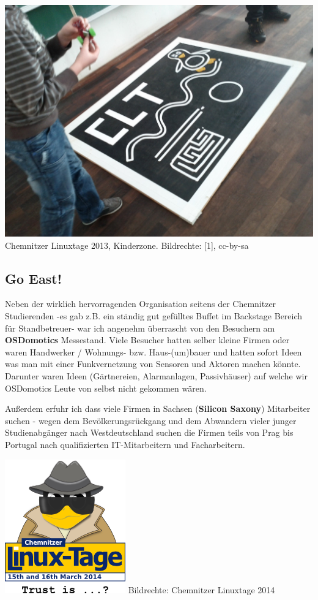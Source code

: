 \begin{center}
\includegraphics[width=\linewidth]{chemnitz_kinderzone1.jpg}
\footnotesize{Chemnitzer Linuxtage 2013, Kinderzone. Bildrechte: [1], cc-by-sa}
\end{center}

\subsection*{Go East!}
Neben der wirklich hervorragenden Organisation seitens der Chemnitzer Studierenden -es gab z.B. ein ständig gut gefülltes Buffet im Backstage Bereich für Standbetreuer- war ich angenehm überrascht von den Besuchern am \textbf{OSDomotics} Messestand. Viele Besucher hatten selber kleine Firmen oder waren Handwerker / Wohnungs- bzw. Haus-(um)bauer und hatten sofort Ideen was man mit einer Funkvernetzung von Sensoren und Aktoren machen könnte. Darunter waren Ideen (Gärtnereien, Alarmanlagen, Passivhäuser) auf welche wir OSDomotics Leute von selbst nicht gekommen wären. 

Außerdem erfuhr ich dass viele Firmen in Sachsen (\textbf{Silicon Saxony}) Mitarbeiter suchen - wegen dem Bevölkerungsrückgang und dem Abwandern vieler junger Studienabgänger nach Westdeutschland suchen die Firmen teils von Prag bis Portugal nach qualifizierten IT-Mitarbeitern und Facharbeitern.

\begin{center}
\includegraphics[width=0.5\linewidth]{chemnitz_logo14.png}
\footnotesize{Bildrechte: Chemnitzer Linuxtage 2014}
\end{center}


